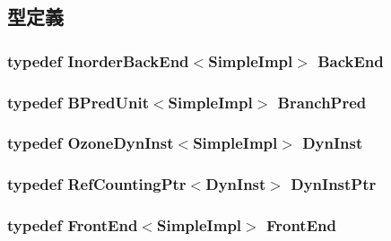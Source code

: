 \subsection{型定義}
\hypertarget{structSimpleImpl_a6f0c893d4a0613a8ccefa1eb8a8cf3bf}{
\subsubsection[{BackEnd}]{\setlength{\rightskip}{0pt plus 5cm}typedef {\bf InorderBackEnd}$<${\bf SimpleImpl}$>$ {\bf BackEnd}}}
\label{structSimpleImpl_a6f0c893d4a0613a8ccefa1eb8a8cf3bf}
\hypertarget{structSimpleImpl_aa571eb59ab7b40e0ebe2f075b7351a87}{
\subsubsection[{BranchPred}]{\setlength{\rightskip}{0pt plus 5cm}typedef {\bf BPredUnit}$<${\bf SimpleImpl}$>$ {\bf BranchPred}}}
\label{structSimpleImpl_aa571eb59ab7b40e0ebe2f075b7351a87}
\hypertarget{structSimpleImpl_a69c9211fabf458755bcbe8aaa6b13f09}{
\subsubsection[{DynInst}]{\setlength{\rightskip}{0pt plus 5cm}typedef {\bf OzoneDynInst}$<${\bf SimpleImpl}$>$ {\bf DynInst}}}
\label{structSimpleImpl_a69c9211fabf458755bcbe8aaa6b13f09}
\hypertarget{structSimpleImpl_a97c1adaf6da40f1dd1f86fe0b3b51249}{
\subsubsection[{DynInstPtr}]{\setlength{\rightskip}{0pt plus 5cm}typedef {\bf RefCountingPtr}$<${\bf DynInst}$>$ {\bf DynInstPtr}}}
\label{structSimpleImpl_a97c1adaf6da40f1dd1f86fe0b3b51249}
\hypertarget{structSimpleImpl_a97cfe75c4e2ec15e611a76b57827e045}{
\subsubsection[{FrontEnd}]{\setlength{\rightskip}{0pt plus 5cm}typedef {\bf FrontEnd}$<${\bf SimpleImpl}$>$ {\bf FrontEnd}}}
